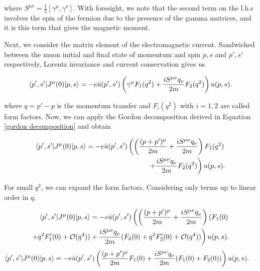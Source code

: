 \documentclass{article}
\numberwithin{equation}{section} %
\begin{document}
\noindent where $S^{\mu\nu} = \frac{1}{2}[\gamma^\mu,\gamma^\nu]$. With foresight\cite{zee}, we note that the second term on the l.h.s involves the spin of the fermion due to the presence of the gamma matrices, and it is this term that gives the magnetic moment.

Next, we consider the matrix element of the electromagnetic current. Sandwiched between the muon initial and final state of momentum and spin $p,s$ and $p',s'$ respectively, Lorentz invariance and current conservation gives us

\begin{equation}
\mathinner{\langle{p',s'|J^\mu(0)|p,s}\rangle} = -e\bar{u}(p',s')\left( \gamma^\mu F_1(q^2) + \frac{iS^{\mu\nu}q_\nu}{2m}F_2(q^2) \right)u(p,s).
\end{equation}

\noindent where $q = p'-p$ is the momentum transfer and $F_i(q^2)$ with $i=1,2$ are called form factors. Now, we can apply the Gordon decomposition derived in Equation \ref{gordon decomposition} and obtain

\begin{equation}
\begin{split}
\mathinner{\langle{p',s'|J^\mu(0)|p,s}\rangle} = -e\bar{u}(p',s')\left( \left( \frac{(p+p')^\mu }{2m} + \frac{iS^{\mu\nu}q_\nu}{2m} \right) F_1(q^2)\right.&\\
\left. + \frac{iS^{\mu\nu}q_\nu}{2m}F_2(q^2) \right)u(p,s).&
\end{split}
\label{em current}
\end{equation}

For small $q^2$, we can expand the form factors. Considering only terms up to linear order in $q$,

\begin{equation}
\begin{split}
\mathinner{\langle{p',s'|J^\mu(0)|p,s}\rangle} = -e\bar{u}(p',s')\left( \left( \frac{(p+p')^\mu }{2m} + \frac{iS^{\mu\nu}q_\nu}{2m} \right) (F_1(0) \right.&\\
\left.  + q^2F'_1(0) + \mathcal{O}(q^4)) + \frac{iS^{\mu\nu}q_\nu}{2m}(F_2(0) + q^2F'_2(0) + \mathcal{O}(q^4)) \right)u(p,s).&
\end{split}
\end{equation}
\begin{equation}
\begin{split}
\mathinner{\langle{p',s'|J^\mu(0)|p,s}\rangle} = -e\bar{u}(p',s')\left( \frac{(p+p')^\mu }{2m} F_1(0) + \frac{iS^{\mu\nu}q_\nu}{2m}(F_1(0)+F_2(0)) \right)u(p,s).&
\end{split}
\label{em current with amu encoded}
\end{equation}
\end{document}
